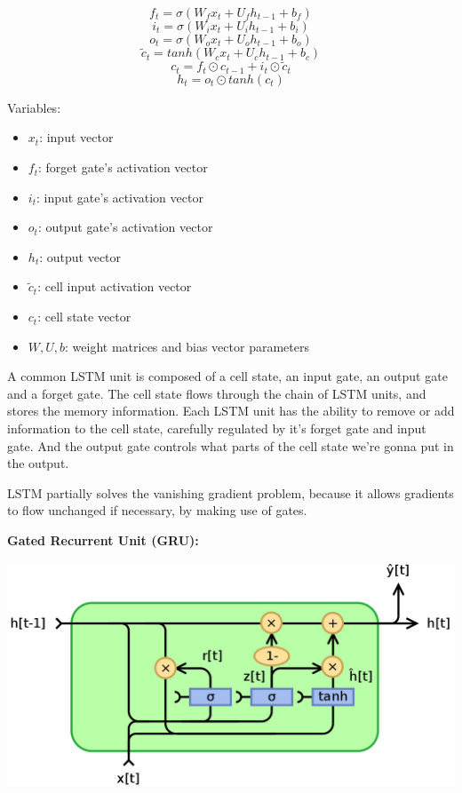 \documentclass{article}
\begin{document}
\[f_{t} = \sigma(W_{f} x_{t} + U_{f} h_{t-1} + b_{f})\]
\[i_{t} = \sigma(W_{i} x_{t} + U_{i} h_{t-1} + b_{i})\]
\[o_{t} = \sigma(W_{o} x_{t} + U_{o} h_{t-1} + b_{o})\]
\[\tilde{c}_{t} = tanh(W_{c} x_{t} + U_{c} h_{t-1} + b_{c})\]
\[c_{t} = f_{t} \odot c_{t-1} + i_{t} \odot \tilde{c}_{t}\]
\[h_{t} = o_{t} \odot tanh(c_{t})\]

\noindent Variables:

\begin{itemize}
    \item \(x_{t}\): input vector
    \item \(f_{t}\): forget gate's activation vector
    \item \(i_{t}\): input gate's activation vector
    \item \(o_{t}\): output gate's activation vector
    \item \(h_{t}\): output vector
    \item \(\tilde{c}_{t}\): cell input activation vector
    \item \(c_{t}\): cell state vector
    \item \(W, U, b\): weight matrices and bias vector parameters
\end{itemize}

\noindent A common LSTM unit is composed of a cell state, an input gate, an output gate and a forget gate. The cell state flows through the chain of LSTM units, and stores the memory information. Each LSTM unit has the ability to remove or add information to the cell state, carefully regulated by it's forget gate and input gate. And the output gate controls what parts of the cell state we’re gonna put in the output.

\bigskip

\noindent LSTM partially solves the vanishing gradient problem, because it allows gradients to flow unchanged if necessary, by making use of gates.

\bigskip

\noindent \textbf{Gated Recurrent Unit (GRU):}

\noindent 

\begin{center}
\includegraphics[scale=0.2]{./images/gru.png}
\end{center}
\end{document}
